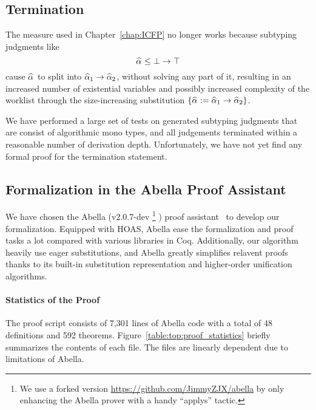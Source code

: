 \subsection{Termination}

The measure used in Chapter~\ref{chap:ICFP} no longer works because subtyping judgments like
$$\al \le \bot \to \top$$
cause $\al$ to split into $\al[1] \to \al[2]$, without solving any part of it,
resulting in an increased number of existential variables
and possibly increased complexity of the worklist through the size-increasing substitution
$\{\al := \al[1] \to \al[2]\}$.

We have performed a large set of tests on generated subtyping judgments
that are consist of algorithmic mono types,
and all judgements terminated within a reasonable number of derivation depth.
Unfortunately, we have not yet find any formal proof for the termination statement.

\subsection{Formalization in the Abella Proof Assistant}

We have chosen the Abella (v2.0.7-dev
\footnote{We use a forked version \url{https://github.com/JimmyZJX/abella} by only enhancing the Abella prover with a handy
``applys'' tactic.}
) proof assistant~\cite{AbellaDesc} to develop our formalization.
Equipped with HOAS, Abella ease the formalization and proof tasks a lot
compared with various libraries in Coq.
Additionally, our algorithm heavily use eager substitutions,
and Abella greatly simplifies relavent proofs thanks to its built-in
substitution representation and higher-order unification algorithms.

\paragraph{Statistics of the Proof}
The proof script consists of 7,301 lines of Abella code with a total of
48 definitions and 592 theorems.
Figure~\ref{table:top:proof_statistics} briefly summarizes the contents of each file.
The files are linearly dependent due to limitations of Abella.

